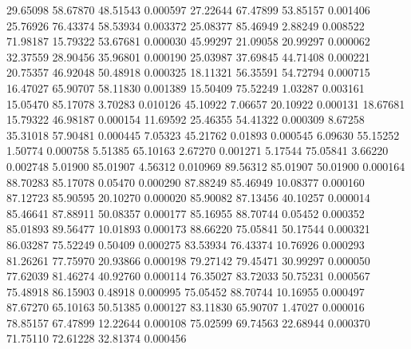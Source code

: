        29.65098       58.67870       48.51543       0.000597
       27.22644       67.47899       53.85157       0.001406
       25.76926       76.43374       58.53934       0.003372
       25.08377       85.46949        2.88249       0.008522
       71.98187       15.79322       53.67681       0.000030
       45.99297       21.09058       20.99297       0.000062
       32.37559       28.90456       35.96801       0.000190
       25.03987       37.69845       44.71408       0.000221
       20.75357       46.92048       50.48918       0.000325
       18.11321       56.35591       54.72794       0.000715
       16.47027       65.90707       58.11830       0.001389
       15.50409       75.52249        1.03287       0.003161
       15.05470       85.17078        3.70283       0.010126
       45.10922        7.06657       20.10922       0.000131
       18.67681       15.79322       46.98187       0.000154
       11.69592       25.46355       54.41322       0.000309
	8.67258       35.31018       57.90481       0.000445
	7.05323       45.21762        0.01893       0.000545
	6.09630       55.15252        1.50774       0.000758
	5.51385       65.10163        2.67270       0.001271
	5.17544       75.05841        3.66220       0.002748
	5.01900       85.01907        4.56312       0.010969
       89.56312       85.01907       50.01900       0.000164
       88.70283       85.17078        0.05470       0.000290
       87.88249       85.46949       10.08377       0.000160
       87.12723       85.90595       20.10270       0.000020
       85.90082       87.13456       40.10257       0.000014
       85.46641       87.88911       50.08357       0.000177
       85.16955       88.70744        0.05452       0.000352
       85.01893       89.56477       10.01893       0.000173
       88.66220       75.05841       50.17544       0.000321
       86.03287       75.52249        0.50409       0.000275
       83.53934       76.43374       10.76926       0.000293
       81.26261       77.75970       20.93866       0.000198
       79.27142       79.45471       30.99297       0.000050
       77.62039       81.46274       40.92760       0.000114
       76.35027       83.72033       50.75231       0.000567
       75.48918       86.15903        0.48918       0.000995
       75.05452       88.70744       10.16955       0.000497
       87.67270       65.10163       50.51385       0.000127
       83.11830       65.90707        1.47027       0.000016
       78.85157       67.47899       12.22644       0.000108
       75.02599       69.74563       22.68944       0.000370
       71.75110       72.61228       32.81374       0.000456
